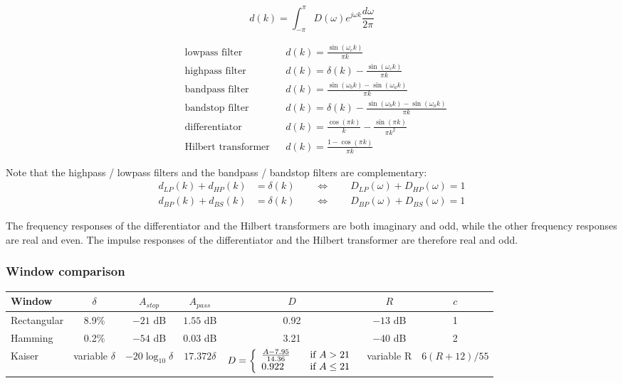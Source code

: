 \begin{equation}
d(k) = \int_{-\pi}^{\pi}D(\omega) e^{j\omega k}\frac{d\omega}{2\pi} \label{eq:impresp}
\end{equation}

\begin{align*}
&\text{lowpass filter} && d(k) = \frac{\sin(\omega_ck)}{\pi k} \\
&\text{highpass filter} && d(k) = \delta(k) - \frac{\sin(\omega_ck)}{\pi k} \\
&\text{bandpass filter} && d(k) = \frac{\sin(\omega_bk) - \sin(\omega_ak)}{\pi k} \\
&\text{bandstop filter} && d(k) = \delta(k) - \frac{\sin(\omega_bk) - \sin(\omega_ak)}{\pi k} \\
&\text{differentiator} && d(k) = \frac{\cos(\pi k)}{k}-\frac{\sin(\pi k)}{\pi k^2}\\
&\text{Hilbert transformer} && d(k) = \frac{1-\cos(\pi k)}{\pi k}
\end{align*}

Note that the highpass / lowpass filters and the bandpass / bandstop
filters are complementary:
\begin{align*}
	d_{LP}(k) + d_{HP}(k) &= \delta(k) \qquad \Leftrightarrow \qquad D_{LP}(\omega) + D_{HP}(\omega) = 1 \\
	d_{BP}(k) + d_{BS}(k) &= \delta(k) \qquad \Leftrightarrow \qquad D_{BP}(\omega) + D_{BS}(\omega) = 1
\end{align*}

The frequency responses of the differentiator and the Hilbert transformers
are both imaginary and odd, while the other frequency responses are real
and even. The impulse responses of the differentiator and the Hilbert
transformer are therefore real and odd.

\subsubsection{Window comparison}
\begin{tabular}{|l|c|c|c|c|c|c|}
	\hline
	Window & $\delta$ & $A_{stop}$ & $A_{pass}$ & $D$ & $R$ & $c$ \\
	\hline
	Rectangular & 8.9\% & $-21$ dB & $1.55$ dB & 0.92 & $-13$ dB & 1\\
	Hamming & 0.2\% & $-54$ dB & $0.03$ dB & 3.21 & $-40$ dB & 2\\
	Kaiser & variable $\delta$ & $-20\log_{10}\delta$ & $17.372\delta$ & $D = \left\{
						\begin{array}{l l}
							\frac{A-7.95}{14.36}& \quad \text{if } A>21\\
							0.922 & \quad \text{if } A \leq 21
						\end{array} \right.$ & variable R & $6(R+12)/55$\\
	\hline
\end{tabular}

